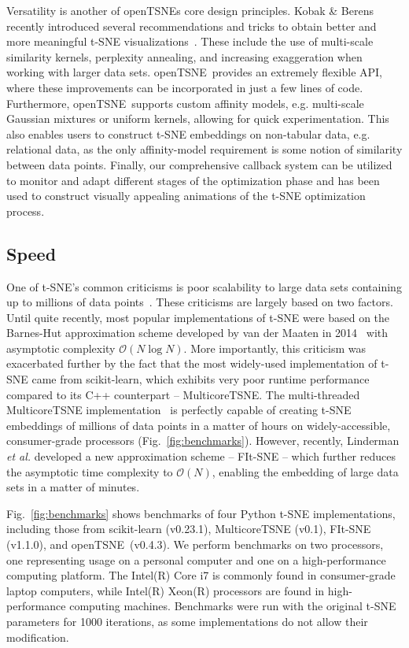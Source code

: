 \documentclass[twocolumn]{bmcart}
\newcommand{\opentsne}{\textsf{openTSNE}}
\begin{document}
Versatility is another of  \opentsne s core design principles. Kobak \& Berens
recently introduced several recommendations and tricks to obtain better and
more meaningful t-SNE visualizations~\cite{kobak2019art}. These include the use
of multi-scale similarity kernels, perplexity annealing, and increasing
exaggeration when working with larger data sets. \opentsne\ provides an
extremely flexible API, where these improvements can be incorporated in just a
few lines of code. Furthermore, \opentsne\ supports custom affinity models,
e.g. multi-scale Gaussian mixtures or uniform kernels, allowing for quick
experimentation. This also enables users to construct t-SNE embeddings on
non-tabular data, e.g. relational data, as the only affinity-model requirement
is some notion of similarity between data points. Finally, our comprehensive
callback system can be utilized to monitor and adapt different stages of the
optimization phase and has been used to construct visually appealing animations
of the t-SNE optimization process.

\subsection*{Speed}

One of t-SNE's common criticisms is poor scalability to large data sets
containing up to millions of data points~\cite{becht2019dimensionality}. These
criticisms are largely based on two factors. Until quite recently, most popular
implementations of t-SNE were based on the Barnes-Hut approximation scheme
developed by van der Maaten in 2014~\cite{van2014accelerating} with asymptotic
complexity $\mathcal{O}(N \log N)$. More importantly, this criticism was
exacerbated further by the fact that the most widely-used implementation of
t-SNE came from \textsf{scikit-learn}, which exhibits very poor runtime
performance compared to its C++ counterpart -- \textsf{MulticoreTSNE}. The
multi-threaded \textsf{MulticoreTSNE} implementation~\cite{Ulyanov2016} is
perfectly capable of creating t-SNE embeddings of millions of data points in a
matter of hours on widely-accessible, consumer-grade processors
(Fig.~\ref{fig:benchmarks}). However, recently, Linderman \textit{et al.}
developed a new approximation scheme -- FIt-SNE -- which further reduces the
asymptotic time complexity to $\mathcal{O}(N)$, enabling the embedding of large
data sets in a matter of minutes.

Fig.~\ref{fig:benchmarks} shows benchmarks of four Python t-SNE implementations, including those from \textsf{scikit-learn} (v0.23.1), \textsf{MulticoreTSNE} (v0.1), \textsf{FIt-SNE} (v1.1.0), and \opentsne\ (v0.4.3). We perform benchmarks on two processors, one representing usage on a personal computer and one on a high-performance computing platform. The Intel(R) Core i7 is commonly found in consumer-grade laptop computers, while Intel(R) Xeon(R) processors are found in high-performance computing machines. Benchmarks were run with the original t-SNE parameters for 1000 iterations, as some implementations do not allow their modification.
\end{document}
